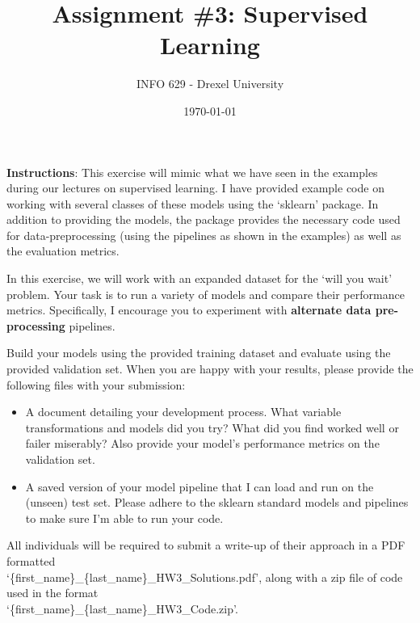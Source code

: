 \documentclass[12pt]{article}
\title{Assignment \#3: Supervised Learning}
\author{INFO 629 - Drexel University}
\date{\today}
\begin{document}
\maketitle

\textbf{Instructions}: 
This exercise will mimic what we have seen in the examples during our lectures on supervised learning. 
I have provided example code on working with several classes of these models using the `sklearn' package.
In addition to providing the models, the package provides the necessary code used for data-preprocessing (using the pipelines as shown in the examples) as well as the evaluation metrics.

In this exercise, we will work with an expanded dataset for the `will you wait' problem.
Your task is to run a variety of models and compare their performance metrics.
Specifically, I encourage you to experiment with \textbf{alternate data pre-processing} pipelines.

Build your models using the provided training dataset and evaluate using the provided validation set.
When you are happy with your results, please provide the following files with your submission:

\begin{itemize}
    \item A document detailing your development process. What variable transformations and models did you try? What did you find worked well or failer miserably? Also provide your model's performance metrics on the validation set.
    \item A saved version of your model pipeline that I can load and run on the (unseen) test set. Please adhere to the sklearn standard models and pipelines to make sure I'm able to run your code.
\end{itemize}

All individuals will be required to submit a write-up of their approach in a PDF formatted
\\
`\{first\_name\}\_\{last\_name\}\_HW3\_Solutions.pdf',  along with a zip file of code used in the format 
\\
`\{first\_name\}\_\{last\_name\}\_HW3\_Code.zip'.
\end{document}
